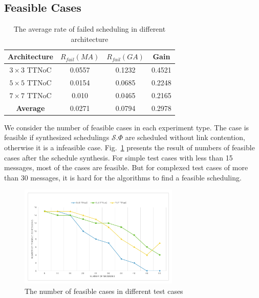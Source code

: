 \documentclass[journal]{IEEEtran}
\newcommand{\calS}{\mathcal{S}}
\theoremstyle{remark}
\begin{document}
\subsection{Feasible Cases}
\begin{table}[!t]
	\renewcommand{\arraystretch}{1.3}
	\caption{The average rate of failed scheduling in different architecture }
	\label{t:performance}
	\centering
	\begin{tabular}{|c||c||c||c|}
		\hline
		\textbf{Architecture} & \textbf{$R_{fail}(MA)$} &\textbf{$R_{fail}(GA)$} & \textbf{Gain}\\
		\hline 
		$3\times 3$ TTNoC&0.0557& 0.1232&	0.4521		
		\\
		\hline
		$5\times 5$ TTNoC& 0.0154	& 0.0685&0.2248\\
		\hline
		$7\times 7$ TTNoC& 0.010& 	0.0465&	0.2165\\
		\hline		
		\hline
		\textbf{Average }& 	0.0271 &0.0794&0.2978\\
		\hline
	\end{tabular}	
\end{table}
We consider the number of feasible cases in each experiment type.
The case is feasible if synthesized schedulings $\calS.\Phi$ are scheduled without link contention,
 otherwise it is a infeasible case.
Fig.~\ref{f:feasible} presents the result of numbers of feasible cases after the schedule synthesis.
For simple test cases with less than 15 messages,
 most of the cases are feasible.
But for complexed test cases of more than 30 messages, it is hard for the algorithms to find a feasible scheduling.
\begin{figure}[!t]
	\centering
	\includegraphics[width=3in]{picture/feasible_case}
	\caption{The number of feasible cases in different test cases}
	\label{f:feasible}
\end{figure}
\end{document}
